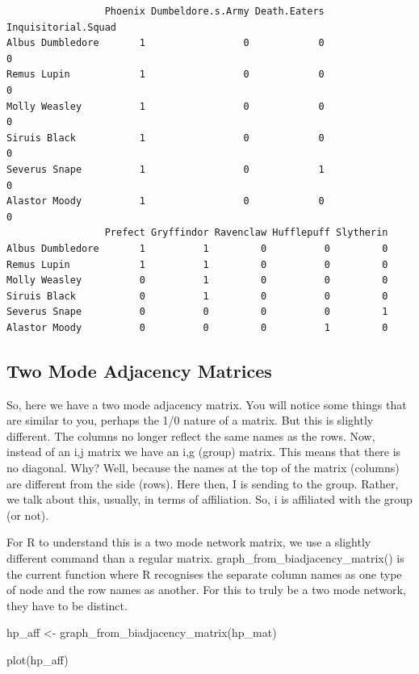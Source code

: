 \documentclass[
  letterpaper,
  DIV=11,
  numbers=noendperiod]{scrreprt}
\newenvironment{Shaded}{\begin{snugshade}}{\end{snugshade}}
\newcommand{\FunctionTok}[1]{\textcolor[rgb]{0.28,0.35,0.67}{#1}}
\newcommand{\NormalTok}[1]{\textcolor[rgb]{0.00,0.23,0.31}{#1}}
\newcommand{\OtherTok}[1]{\textcolor[rgb]{0.00,0.23,0.31}{#1}}
\begin{document}
\begin{verbatim}
                 Phoenix Dumbeldore.s.Army Death.Eaters Inquisitorial.Squad
Albus Dumbledore       1                 0            0                   0
Remus Lupin            1                 0            0                   0
Molly Weasley          1                 0            0                   0
Siruis Black           1                 0            0                   0
Severus Snape          1                 0            1                   0
Alastor Moody          1                 0            0                   0
                 Prefect Gryffindor Ravenclaw Hufflepuff Slytherin
Albus Dumbledore       1          1         0          0         0
Remus Lupin            1          1         0          0         0
Molly Weasley          0          1         0          0         0
Siruis Black           0          1         0          0         0
Severus Snape          0          0         0          0         1
Alastor Moody          0          0         0          1         0
\end{verbatim}

\subsection{Two Mode Adjacency
Matrices}\label{two-mode-adjacency-matrices}

So, here we have a two mode adjacency matrix. You will notice some
things that are similar to you, perhaps the 1/0 nature of a matrix. But
this is slightly different. The columns no longer reflect the same names
as the rows. Now, instead of an i,j matrix we have an i,g (group)
matrix. This means that there is no diagonal. Why? Well, because the
names at the top of the matrix (columns) are different from the side
(rows). Here then, I is sending to the group. Rather, we talk about
this, usually, in terms of affiliation. So, i is affiliated with the
group (or not).

For R to understand this is a two mode network matrix, we use a slightly
different command than a regular matrix.
graph\_from\_biadjacency\_matrix() is the current function where R
recognises the separate column names as one type of node and the row
names as another. For this to truly be a two mode network, they have to
be distinct.

\begin{Shaded}
\begin{Highlighting}[]
\NormalTok{hp\_aff }\OtherTok{\textless{}{-}} \FunctionTok{graph\_from\_biadjacency\_matrix}\NormalTok{(hp\_mat)}


\FunctionTok{plot}\NormalTok{(hp\_aff)}
\end{Highlighting}
\end{Shaded}
\end{document}
